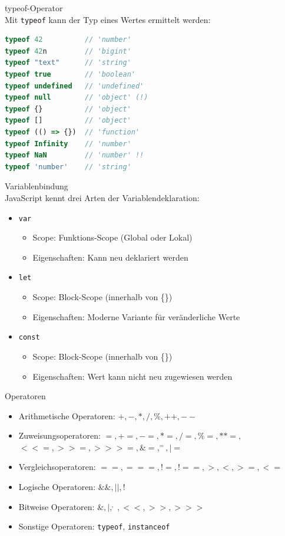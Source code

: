 \begin{KR}{typeof-Operator}\\
Mit \texttt{typeof} kann der Typ eines Wertes ermittelt werden:
\begin{lstlisting}[language=JavaScript, style=basesmol]
typeof 42          // 'number'
typeof 42n         // 'bigint'
typeof "text"      // 'string'
typeof true        // 'boolean'
typeof undefined   // 'undefined'
typeof null        // 'object' (!)
typeof {}          // 'object'
typeof []          // 'object'
typeof (() => {})  // 'function'
typeof Infinity    // 'number'
typeof NaN         // 'number' !!
typeof 'number'    // 'string'
\end{lstlisting}
\end{KR}

\begin{theorem}{Variablenbindung}\\
    JavaScript kennt drei Arten der Variablendeklaration:
    \begin{itemize}
        \item \texttt{var}
        \begin{itemize}
            \item Scope: Funktions-Scope (Global oder Lokal)
            \item Eigenschaften: Kann neu deklariert werden
        \end{itemize}
        \item \texttt{let}
        \begin{itemize}
            \item Scope: Block-Scope (innerhalb von \{\})
            \item Eigenschaften: Moderne Variante für veränderliche Werte
        \end{itemize}
        \item \texttt{const}
        \begin{itemize}
            \item Scope: Block-Scope (innerhalb von \{\})
            \item Eigenschaften: Wert kann nicht neu zugewiesen werden
        \end{itemize}
    \end{itemize}
\end{theorem}

\begin{corollary}{Operatoren}
    \begin{itemize}
        \item Arithmetische Operatoren: $+, -, *, /, \%, ++, --$
        \item Zuweisungsoperatoren: $=, +=, -=, *=, /=, \%=, **=, $\\$<<=, >>=, >>>=, \&=, ^=, |=$
        \item Vergleichsoperatoren: $==, ===, !=, !==, >, <, >=, <=$
        \item Logische Operatoren: $\&\&, ||, !$
        \item Bitweise Operatoren: $\&, |, ^, ~, <<, >>, >>>$
        \item Sonstige Operatoren: \texttt{typeof}, \texttt{instanceof}
    \end{itemize}
\end{corollary}

